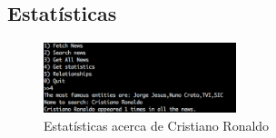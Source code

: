 \subsection{Estatísticas}

\begin{figure}[htbp]
  \centering
    \includegraphics[width=0.5\textwidth]{images/search7.png}
	\caption{Estatísticas acerca de Cristiano Ronaldo}
\end{figure}